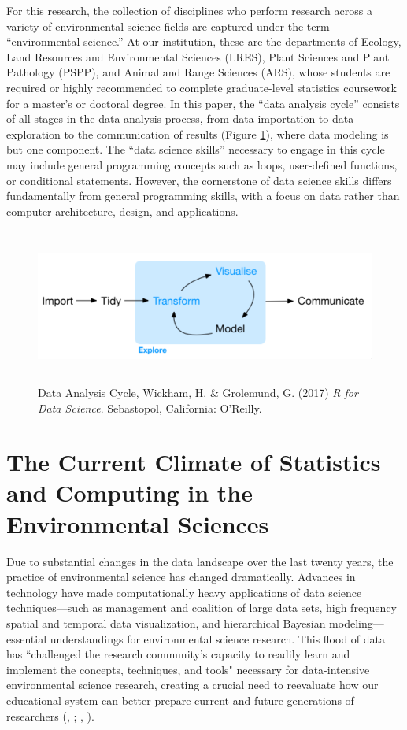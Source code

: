 \documentclass[12pt]{article}
\begin{document}
\quad For this research, the collection of disciplines who perform research 
across a variety of environmental science fields are captured under the term 
``environmental science.'' At our institution, these are the departments of
Ecology, Land Resources and Environmental Sciences (LRES), Plant Sciences and
Plant Pathology (PSPP), and Animal and Range Sciences (ARS), whose students are
required or highly recommended to complete graduate-level statistics coursework
for a master's or doctoral degree. In this paper, the ``data analysis cycle''
consists of all stages in the data analysis process, from data importation to
data exploration to the communication of results (Figure \ref{fig:cycle}), where
data modeling is but one component. The ``data science skills'' necessary to
engage in this cycle may include general programming concepts such as loops,
user-defined functions, or conditional statements. However, the cornerstone of
data science skills differs fundamentally from general programming skills, with
a focus on data rather than computer architecture, design, and applications. 

\begin{figure}[h!]
    \centering
    \includegraphics[width = \textwidth, height = 2in]{images/cycle.png}
    \caption{Data Analysis Cycle, Wickham, H. \& Grolemund, G. (2017) \emph{R 
    for Data Science}. Sebastopol, California: O'Reilly.}
\label{fig:cycle}
\end{figure} 

\section{The Current Climate of Statistics and Computing in the Environmental 
Sciences}
\label{sec:lit}

\noindent Due to substantial changes in the data landscape over the last twenty
years, the practice of environmental science has changed dramatically. Advances
in technology have made computationally heavy 
applications of data science techniques---such as management and coalition of 
large data sets, high frequency spatial and temporal data visualization, and 
hierarchical Bayesian modeling---essential understandings for environmental 
science research. This flood of data has ``challenged the research community's 
capacity to readily learn and implement the concepts, techniques, and tools" 
\citep[p.\ 546]{hampton} necessary for data-intensive environmental science 
research, creating a crucial need to reevaluate how our educational system can
better prepare current and future generations of researchers 
(\citeauthor{green}, \citeyear{green}; \citeauthor{hampton}, 
\citeyear{hampton}).  
\end{document}

